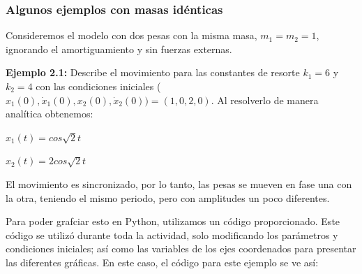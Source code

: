 \documentclass[a4paper]{article}
\begin{document}
\subsubsection{Algunos ejemplos con masas idénticas}
Consideremos el modelo con dos pesas con la misma masa, $m_1 = m_2 = 1$, ignorando el amortiguamiento y sin fuerzas externas.

\textbf{Ejemplo 2.1:} Describe el movimiento para las constantes de resorte $k_1 = 6$ y $k_2 = 4$ con las condiciones iniciales ($x_1(0), \dot x_1(0), x_2(0), \dot x_2(0)) = (1,0,2,0)$.
Al resolverlo de manera analítica obtenemos:
\begin{center}
$x_1(t) = cos \sqrt{2}t$

$x_2(t) = 2 cos \sqrt{2}t$
\end{center}

El movimiento es sincronizado, por lo tanto, las pesas se mueven en fase una con la otra, teniendo el mismo periodo, pero con amplitudes un poco diferentes. 

Para poder grafciar esto en Python, utilizamos un código proporcionado. Este código se utilizó durante toda la actividad, solo modificando los parámetros y condiciones iniciales; así como las variables de los ejes coordenados para presentar las diferentes gráficas. En este caso, el código para este ejemplo se ve así:
\end{document}
